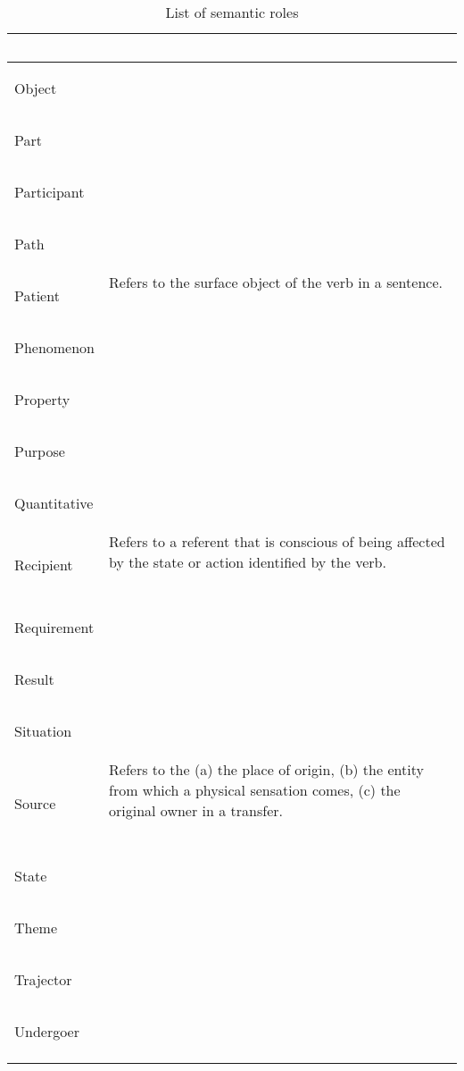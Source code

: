 \documentclass[a4paper,11pt, onecolumn,twoside]{article}
\begin{document}
\begin{longtable}{ p{}  p{} }
        & ~ \\
\midrule
 \multirow{2}{*}{Object} & ~ \\ 
        & ~ \\
\midrule
 \multirow{2}{*}{Part} & ~ \\ 
        & ~ \\
\midrule
 \multirow{2}{*}{Participant} & ~ \\ 
        & ~ \\
\midrule
 \multirow{2}{*}{Path} & ~ \\ 
        & ~ \\
\midrule
 \multirow{2}{*}{Patient} & Refers to the surface object of the verb in a sentence. \\ 
        & ~ \\
\midrule
 \multirow{2}{*}{Phenomenon} & ~ \\ 
        & ~ \\
\midrule
 \multirow{2}{*}{Property} & ~ \\ 
        & ~ \\
\midrule
 \multirow{2}{*}{Purpose} & ~ \\ 
        & ~ \\
\midrule
 \multirow{2}{*}{Quantitative} & ~ \\ 
        & ~ \\
\midrule
 \multirow{2}{*}{Recipient} & Refers to a referent that is conscious of being affected by the state or action identified by the verb. \\ 
        & ~ \\
\midrule
 \multirow{2}{*}{Requirement} & ~ \\ 
        & ~ \\
\midrule
 \multirow{2}{*}{Result} & ~ \\ 
        & ~ \\
\midrule
 \multirow{2}{*}{Situation} & ~ \\ 
        & ~ \\
\midrule
 \multirow{2}{*}{Source} & Refers to the (a) the place of origin, (b) the entity from which a physical sensation comes, (c) the original owner in a transfer. \\ 
        & ~ \\
\midrule
 \multirow{2}{*}{State} & ~ \\ 
        & ~ \\
\midrule
 \multirow{2}{*}{Theme} & ~ \\ 
        & ~ \\
\midrule
 \multirow{2}{*}{Trajector} & ~ \\ 
        & ~ \\
\midrule
 \multirow{2}{*}{Undergoer} & ~ \\ 
        & ~ \\
\bottomrule
\caption{List of semantic roles}
\label{table:semroles}
\end{longtable}
\end{document}
